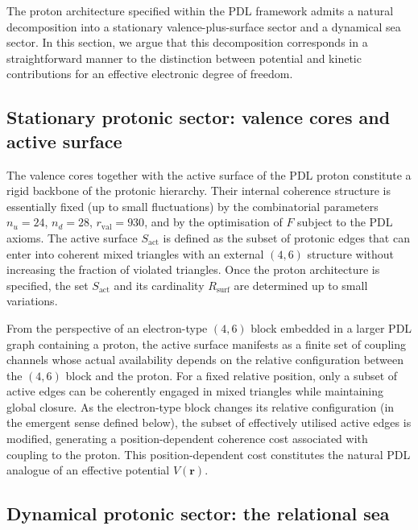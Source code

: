 \documentclass[11pt,a4paper]{article}
\begin{document}
The proton architecture specified within the PDL framework admits a natural decomposition into a stationary valence-plus-surface sector and a dynamical sea sector. In this section, we argue that this decomposition corresponds in a straightforward manner to the distinction between potential and kinetic contributions for an effective electronic degree of freedom.

\subsection{Stationary protonic sector: valence cores and active surface}

The valence cores together with the active surface of the PDL proton constitute a rigid backbone of the protonic hierarchy.\cite{Laubscher2026PDL_English,Laubscher2026DerivationAlpha} Their internal coherence structure is essentially fixed (up to small fluctuations) by the combinatorial parameters $n_u=24$, $n_d=28$, $r_{\mathrm{val}}=930$, and by the optimisation of $F$ subject to the PDL axioms. The active surface $S_{\mathrm{act}}$ is defined as the subset of protonic edges that can enter into coherent mixed triangles with an external $(4,6)$ structure without increasing the fraction of violated triangles. Once the proton architecture is specified, the set $S_{\mathrm{act}}$ and its cardinality $R_{\mathrm{surf}}$ are determined up to small variations.\par From the perspective of an electron-type $(4,6)$ block embedded in a larger PDL graph containing a proton, the active surface manifests as a finite set of coupling channels whose actual availability depends on the relative configuration between the $(4,6)$ block and the proton. For a fixed relative position, only a subset of active edges can be coherently engaged in mixed triangles while maintaining global closure. As the electron-type block changes its relative configuration (in the emergent sense defined below), the subset of effectively utilised active edges is modified, generating a position-dependent coherence cost associated with coupling to the proton. This position-dependent cost constitutes the natural PDL analogue of an effective potential $V(\mathbf{r})$.

\subsection{Dynamical protonic sector: the relational sea}
\end{document}
